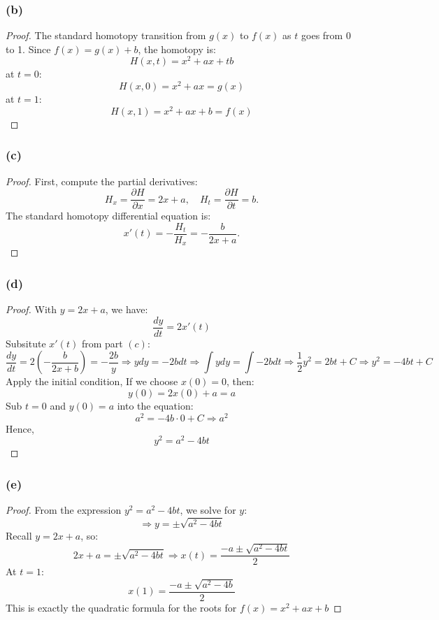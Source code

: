 \documentclass{article}
\begin{document}
\subsubsection*{(b)}
\begin{proof}
    The standard homotopy transition from $g(x)$ to $f(x)$ as $t$ goes from 0 to 1. Since $f(x) = g(x) + b$, the homotopy is:
    \[ H(x,t) = x^2 + ax + tb \]
    at $t = 0$:
    \[ H(x,0) = x^2 + ax = g(x) \] 
    at $t = 1$:
    \[ H(x,1) = x^2 + ax + b = f(x) \] 
\end{proof}

\subsubsection*{(c)}
\begin{proof}
    First, compute the partial derivatives:
    \[
        H_x = \frac{\partial H}{\partial x} = 2x + a, \quad H_t = \frac{\partial H}{\partial t} = b.
    \]
    The standard homotopy differential equation is:
    \[
        x'(t) = -\frac{H_t}{H_x} = -\frac{b}{2x + a}.
    \]
\end{proof}

\subsubsection*{(d)}
\begin{proof}
    With $y = 2x + a$, we have:
    \[
        \frac{dy}{dt} = 2x'(t)
    \]
    Subsitute $x'(t)$ from part $(c)$:
    \[ 
        \frac{dy}{dt} = 2\left( -\frac{b}{2x + b} \right) = -\frac{2b}{y} 
        \Rightarrow y dy = -2b dt 
        \Rightarrow \int y dy = \int -2b dt \Longrightarrow \frac{1}{2}y^2 = 2bt + C
        \Rightarrow y^2 = -4bt + C
    \]
    Apply the initial condition, If we choose $x(0) = 0$, then:
    \[ y(0) = 2x(0) + a = a \]
    Sub $t = 0$ and $y(0) = a$ into the equation:
    \[ a^2 = -4b \cdot 0 + C \Longrightarrow a^2 \]
    Hence, 
    \[ y^2 = a^2 - 4bt \]
\end{proof}

\subsubsection*{(e)}
\begin{proof}
    From the expression $y^2 = a^2 - 4bt$, we solve for $y$:
    \[ \Rightarrow y = \pm \sqrt{a^2 - 4bt} \]
    Recall $y = 2x + a$, so:
    \[ 2x + a = \pm \sqrt{a^2 - 4bt} \Rightarrow x(t) = \frac{-a \pm \sqrt{a^2 - 4bt}}{2} \]
    At $t = 1$:
    \[ x(1) = \frac{-a \pm \sqrt{a^2 - 4b}}{2} \]
    This is exactly the quadratic formula for the roots for $f(x) = x^2 + ax + b$
\end{proof}
\end{document}
